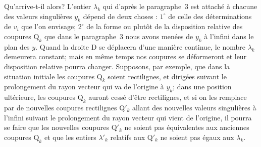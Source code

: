\documentclass{article}
\begin{document}
Qu'arrive-t-il alors? L'entier $\lambda_{k}$ qui d'après le paragraphe~3 est attaché à chacune des valeurs singulières $y_{k}$ dépend de deux choses : $1^{\circ}$ de celle des déterminations de $v_{i}$ que l'on envisage; $2^{\circ}$ de la forme ou plutôt de la disposition relative des coupures $\mathrm{Q}_{k}$ que dans le paragraphe~3 nous avons menées de $y_{k}$ à l'infini dans le plan des $y$. Quand la droite $\mathrm{D}$ se déplacera d'une manière continue, le nombre $\lambda_{k}$ demeurera constant; mais en même temps nos coupures se déformeront et leur disposition relative pourra changer. Supposons,
par exemple, que dans la situation initiale les coupures $\mathrm{Q}_{k}$ soient rectilignes, et dirigées suivant le prolongement du rayon vecteur qui va de l'origine à $y_{k}$; dans une position ultérieure, les coupures $\mathrm{Q}_{k}$ auront cessé d'être rectilignes, et si on les remplace par de nouvelles coupures rectilignes $\mathrm{Q}'_{k}$ allant des nouvelles valeurs singulières à l'infini suivant le prolongement du rayon vecteur qui vient de l'origine, il pourra se faire que les nouvelles coupures $\mathrm{Q}'_{k}$ ne soient pas équivalentes aux anciennes coupures $\mathrm{Q}_{k}$ et que les entiers $\lambda'_{k}$ relatifs aux $\mathrm{Q}'_{k}$ ne soient pas égaux aux $\lambda_{k}$.
\end{document}
